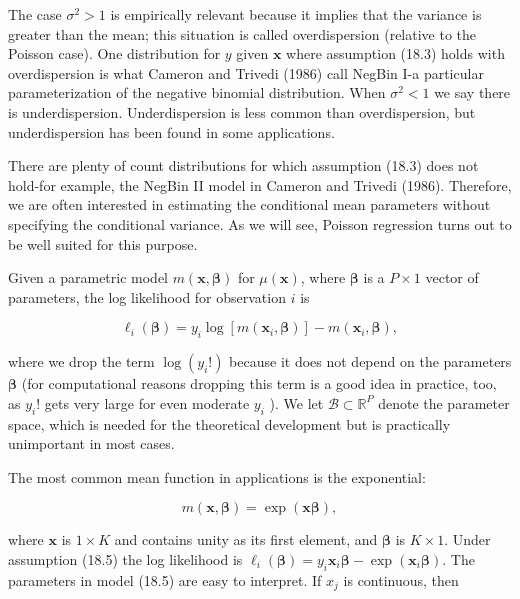 \documentclass[10pt]{article}
\begin{document}
The case $\sigma^{2}>1$ is empirically relevant because it implies that the variance is greater than the mean; this situation is called overdispersion (relative to the Poisson case). One distribution for $y$ given $\mathbf{x}$ where assumption (18.3) holds with overdispersion is what Cameron and Trivedi (1986) call NegBin I-a particular parameterization of the negative binomial distribution. When $\sigma^{2}<1$ we say there is underdispersion. Underdispersion is less common than overdispersion, but underdispersion has been found in some applications.

There are plenty of count distributions for which assumption (18.3) does not hold-for example, the NegBin II model in Cameron and Trivedi (1986). Therefore, we are often interested in estimating the conditional mean parameters without specifying the conditional variance. As we will see, Poisson regression turns out to be well suited for this purpose.

Given a parametric model $m(\mathbf{x}, \boldsymbol{\beta})$ for $\mu(\mathbf{x})$, where $\boldsymbol{\beta}$ is a $P \times 1$ vector of parameters, the log likelihood for observation $i$ is


\begin{equation*}
\ell_{i}(\boldsymbol{\beta})=y_{i} \log \left[m\left(\mathbf{x}_{i}, \boldsymbol{\beta}\right)\right]-m\left(\mathbf{x}_{i}, \boldsymbol{\beta}\right), \tag{18.4}
\end{equation*}


where we drop the term $\log \left(y_{i}!\right)$ because it does not depend on the parameters $\boldsymbol{\beta}$ (for computational reasons dropping this term is a good idea in practice, too, as $y_{i}!$ gets very large for even moderate $y_{i}$ ). We let $\mathscr{B} \subset \mathbb{R}^{P}$ denote the parameter space, which is needed for the theoretical development but is practically unimportant in most cases.

The most common mean function in applications is the exponential:


\begin{equation*}
m(\mathbf{x}, \boldsymbol{\beta})=\exp (\mathbf{x} \boldsymbol{\beta}), \tag{18.5}
\end{equation*}


where $\mathbf{x}$ is $1 \times K$ and contains unity as its first element, and $\boldsymbol{\beta}$ is $K \times 1$. Under assumption (18.5) the log likelihood is $\ell_{i}(\boldsymbol{\beta})=y_{i} \mathbf{x}_{i} \boldsymbol{\beta}-\exp \left(\mathbf{x}_{i} \boldsymbol{\beta}\right)$. The parameters in model (18.5) are easy to interpret. If $x_{j}$ is continuous, then
\end{document}
